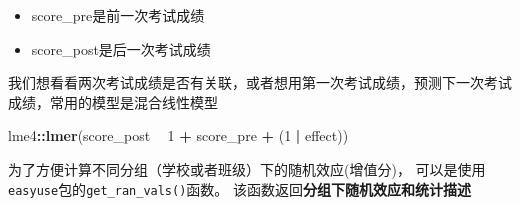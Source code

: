 \documentclass[
]{krantz}
\makeatletter
\newenvironment{Shaded}{\begin{snugshade}}{\end{snugshade}}
\newcommand{\DataTypeTok}[1]{\textcolor[rgb]{0.27,0.27,0.27}{#1}}
\newcommand{\DecValTok}[1]{\textcolor[rgb]{0.06,0.06,0.06}{#1}}
\newcommand{\KeywordTok}[1]{\textcolor[rgb]{0.27,0.27,0.27}{\textbf{#1}}}
\newcommand{\NormalTok}[1]{#1}
\newcommand{\OperatorTok}[1]{\textcolor[rgb]{0.43,0.43,0.43}{\textbf{#1}}}
\newcommand{\OtherTok}[1]{\textcolor[rgb]{0.37,0.37,0.37}{#1}}
\newcommand{\StringTok}[1]{\textcolor[rgb]{0.5,0.5,0.5}{#1}}
\providecommand{\tightlist}{%
  \setlength{\itemsep}{0pt}\setlength{\parskip}{0pt}}
\newenvironment{kframe}{%
\medskip{}
\setlength{\fboxsep}{.8em}
 \def\at@end@of@kframe{}%
 \ifinner\ifhmode%
  \def\at@end@of@kframe{\end{minipage}}%
  \begin{minipage}{\columnwidth}%
 \fi\fi%
 \def\FrameCommand##1{\hskip\@totalleftmargin \hskip-\fboxsep
 \colorbox{shadecolor}{##1}\hskip-\fboxsep
     \hskip-\linewidth \hskip-\@totalleftmargin \hskip\columnwidth}%
 \MakeFramed {\advance\hsize-\width
   \@totalleftmargin\z@ \linewidth\hsize
   \@setminipage}}%
 {\par\unskip\endMakeFramed%
 \at@end@of@kframe}
\renewenvironment{Shaded}{\begin{kframe}}{\end{kframe}}
\makeatother
\begin{document}
\begin{itemize}
\tightlist
\item
  score\_pre是前一次考试成绩
\item
  score\_post是后一次考试成绩
\end{itemize}

我们想看看两次考试成绩是否有关联，或者想用第一次考试成绩，预测下一次考试成绩，常用的模型是混合线性模型

\begin{Shaded}
\begin{Highlighting}[]
\NormalTok{lme4}\OperatorTok{::}\KeywordTok{lmer}\NormalTok{(score_post }\OperatorTok{~}\StringTok{ }\DecValTok{1} \OperatorTok{+}\StringTok{ }\NormalTok{score_pre }\OperatorTok{+}\StringTok{ }\NormalTok{(}\DecValTok{1} \OperatorTok{|}\StringTok{ }\NormalTok{effect))}
\end{Highlighting}
\end{Shaded}

为了方便计算不同分组（学校或者班级）下的随机效应(增值分)， 可以是使用\texttt{easyuse}包的\texttt{get\_ran\_vals()}函数。
该函数返回\textbf{分组下随机效应和统计描述}

\begin{Shaded}
\end{Shaded}
\end{document}
